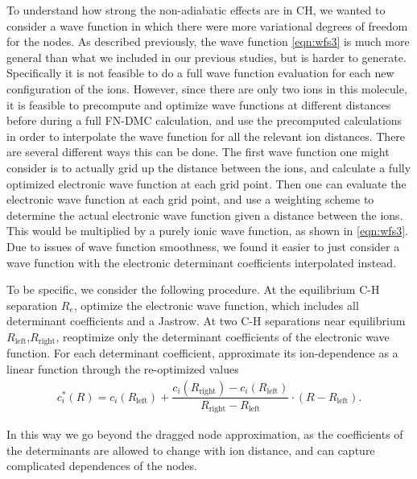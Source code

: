 \documentclass[aip,jcp,numerical,reprint]{revtex4-1}
\begin{document}
To understand how strong the non-adiabatic effects are in CH, we wanted to consider a wave function in which there were more variational degrees of freedom for the nodes.  As described previously, the wave function \eqref{eqn:wfs3} is much more general than what we included in our previous studies, but is harder to generate.  Specifically it is not feasible to do a full wave function evaluation for each new configuration of the ions.  However, since there are only two ions in this molecule, it is feasible to precompute and optimize wave functions at different distances before during a full FN-DMC calculation, and use the precomputed calculations in order to interpolate the wave function for all the relevant ion distances.  There are several different ways this can be done.   The first wave function one might consider is to actually grid up the distance between the ions, and calculate a fully optimized electronic wave function at each grid point.  Then one can evaluate the electronic wave function at each grid point, and use a weighting scheme to determine the actual electronic wave function given a distance between the ions.  This would be multiplied by a purely ionic wave function, as shown in \eqref{eqn:wfs3}.  Due to issues of wave function smoothness, we found it easier to just consider a wave function with the electronic determinant coefficients interpolated instead.

To be specific, we consider the following procedure. At the equilibrium C-H separation $R_e$, optimize the electronic wave function, which includes all determinant coefficients and a Jastrow. At two C-H separations near equilibrium $R_{\text{left}}$,$R_{\text{right}}$, reoptimize only the determinant coefficients of the electronic wave function. For each determinant coefficient, approximate its ion-dependence as a linear function through the re-optimized values
\begin{align}
c_i^*(R) = c_i(R_{\text{left}}) + 
\dfrac{c_i(R_{\text{right}}) - c_i(R_{\text{left}})}{R_{\text{right}}-R_{\text{left}}}\cdot(R-R_{\text{left}}).
\end{align}

In this way we go beyond the dragged node approximation, as the coefficients of the determinants are allowed to change with ion distance, and can capture complicated dependences of the nodes. 

\end{document}

